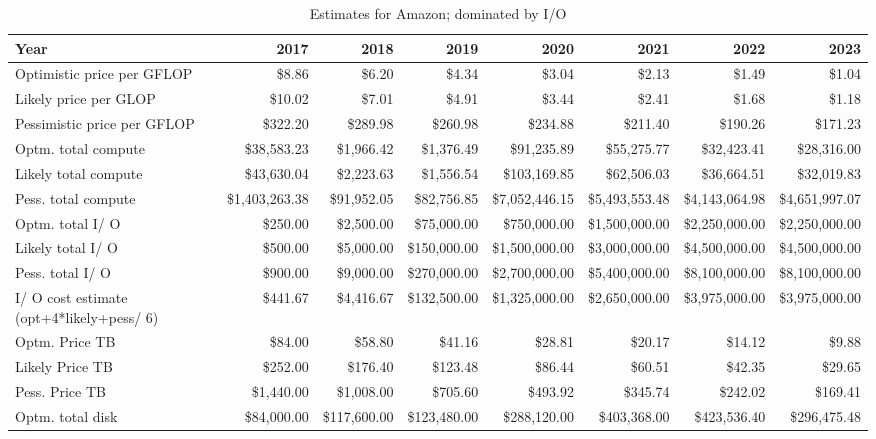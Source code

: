 \tiny \begin{longtable} { |p{}  |r  |r  |r  |r  |r  |r  |r |} 
\caption{Estimates for Amazon; dominated by I/O \label{tab:Amazon}}\\ 
\hline 
\textbf{Year}&\textbf{2017}&\textbf{2018}&\textbf{2019}&\textbf{2020}&\textbf{2021}&\textbf{2022}&\textbf{2023} \\ \hline
{Optimistic price per GFLOP}&{\$8.86}&{\$6.20}&{\$4.34}&{\$3.04}&{\$2.13}&{\$1.49}&{\$1.04} \\ \hline
{Likely price per GLOP}&{\$10.02}&{\$7.01}&{\$4.91}&{\$3.44}&{\$2.41}&{\$1.68}&{\$1.18} \\ \hline
{Pessimistic price per GFLOP}&{\$322.20}&{\$289.98}&{\$260.98}&{\$234.88}&{\$211.40}&{\$190.26}&{\$171.23} \\ \hline
{Optm. total compute}&{\$38,583.23}&{\$1,966.42}&{\$1,376.49}&{\$91,235.89}&{\$55,275.77}&{\$32,423.41}&{\$28,316.00} \\ \hline
{Likely total compute}&{\$43,630.04}&{\$2,223.63}&{\$1,556.54}&{\$103,169.85}&{\$62,506.03}&{\$36,664.51}&{\$32,019.83} \\ \hline
{Pess. total compute}&{\$1,403,263.38}&{\$91,952.05}&{\$82,756.85}&{\$7,052,446.15}&{\$5,493,553.48}&{\$4,143,064.98}&{\$4,651,997.07} \\ \hline
{Optm. total I/ O}&{\$250.00}&{\$2,500.00}&{\$75,000.00}&{\$750,000.00}&{\$1,500,000.00}&{\$2,250,000.00}&{\$2,250,000.00} \\ \hline
{Likely total I/ O}&{\$500.00}&{\$5,000.00}&{\$150,000.00}&{\$1,500,000.00}&{\$3,000,000.00}&{\$4,500,000.00}&{\$4,500,000.00} \\ \hline
{Pess. total I/ O}&{\$900.00}&{\$9,000.00}&{\$270,000.00}&{\$2,700,000.00}&{\$5,400,000.00}&{\$8,100,000.00}&{\$8,100,000.00} \\ \hline
{I/ O cost estimate (opt+4*likely+pess/ 6)}&{\$441.67}&{\$4,416.67}&{\$132,500.00}&{\$1,325,000.00}&{\$2,650,000.00}&{\$3,975,000.00}&{\$3,975,000.00} \\ \hline
{Optm. Price TB}&{\$84.00}&{\$58.80}&{\$41.16}&{\$28.81}&{\$20.17}&{\$14.12}&{\$9.88} \\ \hline
{Likely Price TB}&{\$252.00}&{\$176.40}&{\$123.48}&{\$86.44}&{\$60.51}&{\$42.35}&{\$29.65} \\ \hline
{Pess. Price TB}&{\$1,440.00}&{\$1,008.00}&{\$705.60}&{\$493.92}&{\$345.74}&{\$242.02}&{\$169.41} \\ \hline
{Optm. total disk}&{\$84,000.00}&{\$117,600.00}&{\$123,480.00}&{\$288,120.00}&{\$403,368.00}&{\$423,536.40}&{\$296,475.48} \\ \hline

\end{longtable}
